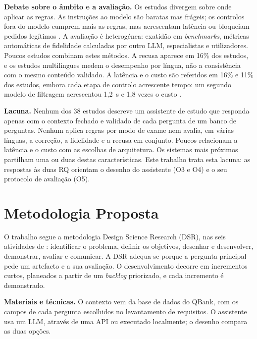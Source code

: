 \documentclass[11pt,a4paper]{article}
\begin{document}
\textbf{Debate sobre o âmbito e a avaliação.} Os estudos divergem sobre onde aplicar as regras. As instruções ao modelo são baratas mas frágeis; os controlos fora do modelo cumprem mais as regras, mas acrescentam latência ou bloqueiam pedidos legítimos \parencite{rayhan2026sage,walczak2026comparative}. A avaliação é heterogénea: exatidão em \emph{benchmarks}, métricas automáticas de fidelidade calculadas por outro LLM, especialistas e utilizadores. Poucos estudos combinam estes métodos. A recusa aparece em 16\% dos estudos, e os estudos multilingues medem o desempenho por língua, não a consistência com o mesmo conteúdo validado. A latência e o custo são referidos em 16\% e 11\% dos estudos, embora cada etapa de controlo acrescente tempo: um segundo modelo de filtragem acrescentou 1,2~s e 1,8 vezes o custo \parencite{emekci2025securing}.

\textbf{Lacuna.} Nenhum dos 38 estudos descreve um assistente de estudo que responda apenas com o contexto fechado e validado de cada pergunta de um banco de perguntas. Nenhum aplica regras por modo de exame nem avalia, em várias línguas, a correção, a fidelidade e a recusa em conjunto. Poucos relacionam a latência e o custo com as escolhas de arquitetura. Os sistemas mais próximos partilham uma ou duas destas características. Este trabalho trata esta lacuna: as respostas às duas RQ orientam o desenho do assistente (O3 e O4) e o seu protocolo de avaliação (O5).

\section{Metodologia Proposta}

O trabalho segue a metodologia Design Science Research (DSR), nas seis atividades de \textcite{peffers2007design}: identificar o problema, definir os objetivos, desenhar e desenvolver, demonstrar, avaliar e comunicar. A DSR adequa-se porque a pergunta principal pede um artefacto e a sua avaliação. O desenvolvimento decorre em incrementos curtos, planeados a partir de um \emph{backlog} priorizado, e cada incremento é demonstrado.

\textbf{Materiais e técnicas.} O contexto vem da base de dados do QBank, com os campos de cada pergunta escolhidos no levantamento de requisitos. O assistente usa um LLM, através de uma API ou executado localmente; o desenho compara as duas opções.
\end{document}
